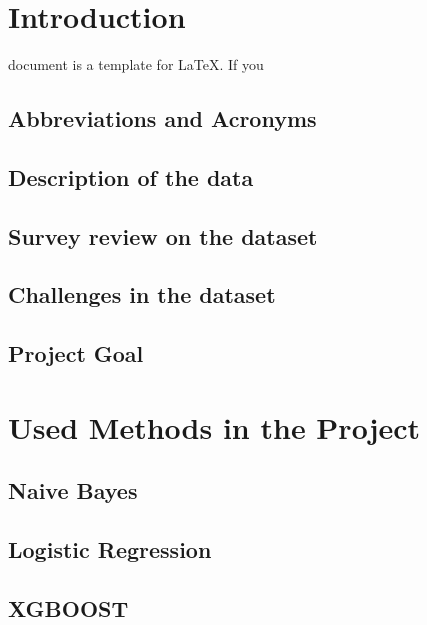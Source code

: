 \documentclass[journal,twoside,web]{ieeecolor}
\begin{document}
\section{Introduction}
\label{sec:introduction}
 document is a template for \LaTeX. If you  

\subsection{Abbreviations and Acronyms}


\subsection{Description of the data}



\subsection{Survey review on the dataset}




\subsection{Challenges in the dataset}


\subsection{Project Goal}




\section{Used Methods in the Project}


\subsection{Naive Bayes}



\subsection{Logistic Regression}


\subsection{XGBOOST}
\end{document}
